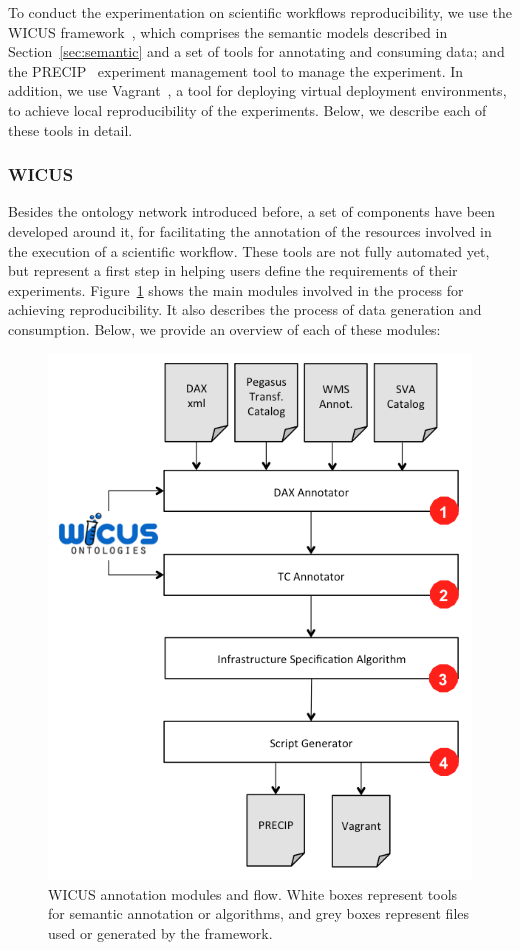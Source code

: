 To conduct the experimentation on scientific workflows reproducibility, we 
use the WICUS framework~\cite{wicus}, which comprises the semantic models described 
in Section~\ref{sec:semantic} and a set of tools for annotating and consuming data; and 
the PRECIP~\cite{Azarnoosh-CRC-2013} experiment management tool to manage the 
experiment. In addition, we use Vagrant~\cite{palat2012introducing}, a tool for deploying virtual
deployment environments,  to achieve local reproducibility of the experiments. 
Below, we describe each of these tools in detail.


\subsubsection{WICUS}
\label{subsec:wicus}

Besides the ontology network introduced before, a set of components have been developed around it, 
for facilitating the annotation of the resources involved in the execution of a scientific workflow. 
These tools are not fully automated yet, but represent a first step in helping users define the requirements of their 
experiments. Figure~\ref{fig:wicusflow} shows the main modules involved in the process for achieving reproducibility. 
It also describes the process of data generation and consumption. Below, we provide an overview of each of these modules:

\begin{figure}[!htb]
	\centering
	\includegraphics[width=.8\linewidth]{figures/wicusflow}
	\caption{WICUS annotation modules and flow. White boxes represent tools for semantic annotation or algorithms, and grey boxes represent files used or generated by the framework.}
	\label{fig:wicusflow}
\end{figure}

